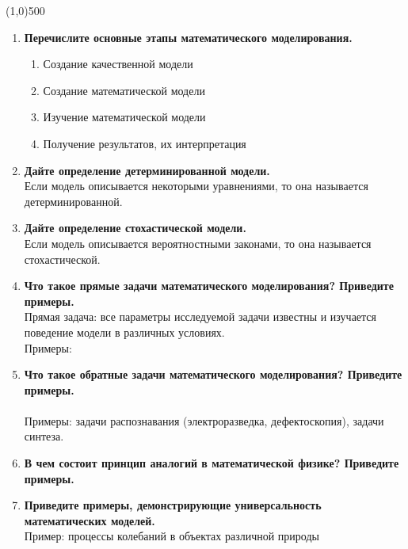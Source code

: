 


\fontsize{20}{24}
\line(1,0){500}
\fontsize{12}{15}
\begin{enumerate}[label=\textbf{\underline{\arabic*.}}]
\item \textbf{Перечислите основные этапы математического моделирования.}\\
      \begin{enumerate}
      \item Создание качественной модели
      \item Создание математической модели
      \item Изучение математической модели
      \item Получение результатов, их интерпретация
      \end{enumerate}
\item \textbf{Дайте определение детерминированной модели.}\\
      Если модель описывается некоторыми уравнениями, то она называется детерминированной.
\item \textbf{Дайте определение стохастической модели.}\\
      Если модель описывается вероятностными законами, то она называется стохастической.
\item \textbf{Что такое прямые задачи математического моделирования? Приведите примеры.}\\
      Прямая задача: все параметры исследуемой задачи известны и изучается поведение модели в различных условиях.\\
      Примеры: \tobewritten
\item \textbf{Что такое обратные задачи математического моделирования? Приведите примеры.}\\
      \tobewritten\\
      Примеры: задачи распознавания (электроразведка, дефектоскопия), задачи синтеза.
\item \textbf{В чем состоит принцип аналогий в математической физике? Приведите примеры.}\\
	\tobewritten
\item \textbf{Приведите примеры, демонстрирующие универсальность математических моделей.}\\
      Пример: процессы колебаний в объектах различной природы\\
      \begin{enumerate}

\end{enumerate}
\end{enumerate}
